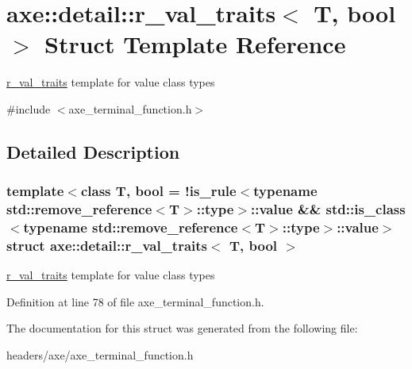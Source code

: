 \hypertarget{structaxe_1_1detail_1_1r__val__traits}{\section{axe\+:\+:detail\+:\+:r\+\_\+val\+\_\+traits$<$ T, bool $>$ Struct Template Reference}
\label{structaxe_1_1detail_1_1r__val__traits}
}


\hyperlink{structaxe_1_1detail_1_1r__val__traits}{r\+\_\+val\+\_\+traits} template for value class types  




{\ttfamily \#include $<$axe\+\_\+terminal\+\_\+function.\+h$>$}



\subsection{Detailed Description}
\subsubsection*{template$<$class T, bool = !is\+\_\+rule$<$typename std\+::remove\+\_\+reference$<$\+T$>$\+::type$>$\+::value \&\& std\+::is\+\_\+class$<$typename std\+::remove\+\_\+reference$<$\+T$>$\+::type$>$\+::value$>$struct axe\+::detail\+::r\+\_\+val\+\_\+traits$<$ T, bool $>$}

\hyperlink{structaxe_1_1detail_1_1r__val__traits}{r\+\_\+val\+\_\+traits} template for value class types 

Definition at line 78 of file axe\+\_\+terminal\+\_\+function.\+h.



The documentation for this struct was generated from the following file\+:\begin{DoxyCompactItemize}
\item 
headers/axe/axe\+\_\+terminal\+\_\+function.\+h\end{DoxyCompactItemize}
